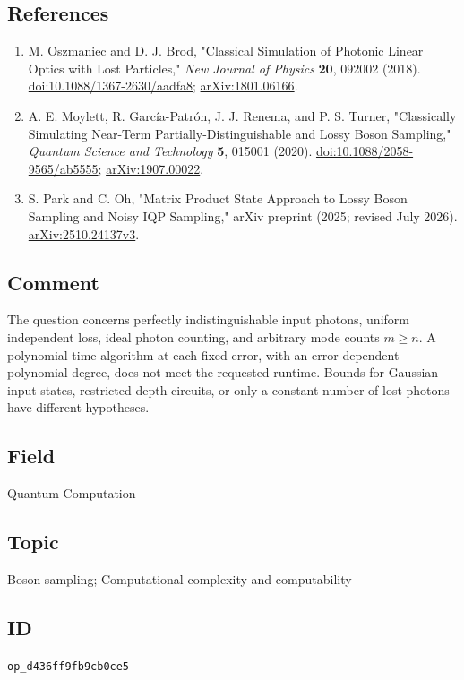 \subsection*{References}

\begin{enumerate}[label={},leftmargin=4.8em,labelsep=0.5em]
  \footnotesize
  \item[\textup{[OB18]}]\label{ref:loss-ob}
  M. Oszmaniec and D. J. Brod, "Classical Simulation of Photonic Linear Optics with Lost Particles," \emph{New Journal of Physics} \textbf{20}, 092002 (2018). \href{https://doi.org/10.1088/1367-2630/aadfa8}{doi:10.1088/1367-2630/aadfa8}; \href{https://arxiv.org/abs/1801.06166}{arXiv:1801.06166}.

  \item[\textup{[MGRT20]}]\label{ref:loss-mgrt}
  A. E. Moylett, R. Garc\'ia-Patr\'on, J. J. Renema, and P. S. Turner, "Classically Simulating Near-Term Partially-Distinguishable and Lossy Boson Sampling," \emph{Quantum Science and Technology} \textbf{5}, 015001 (2020). \href{https://doi.org/10.1088/2058-9565/ab5555}{doi:10.1088/2058-9565/ab5555}; \href{https://arxiv.org/abs/1907.00022}{arXiv:1907.00022}.

  \item[\textup{[PO26]}]\label{ref:loss-po}
  S. Park and C. Oh, "Matrix Product State Approach to Lossy Boson Sampling and Noisy IQP Sampling," arXiv preprint (2025; revised July 2026). \href{https://arxiv.org/abs/2510.24137v3}{arXiv:2510.24137v3}.
\end{enumerate}

\subsection*{Comment}

The question concerns perfectly indistinguishable input photons, uniform independent loss, ideal photon counting, and arbitrary mode counts $m\geq n$.
A polynomial-time algorithm at each fixed error, with an error-dependent polynomial degree, does not meet the requested runtime.
Bounds for Gaussian input states, restricted-depth circuits, or only a constant number of lost photons have different hypotheses.

\subsection*{Field}

Quantum Computation

\subsection*{Topic}

Boson sampling; Computational complexity and computability

\subsection*{ID}

\texttt{op\_d436ff9fb9cb0ce5}
